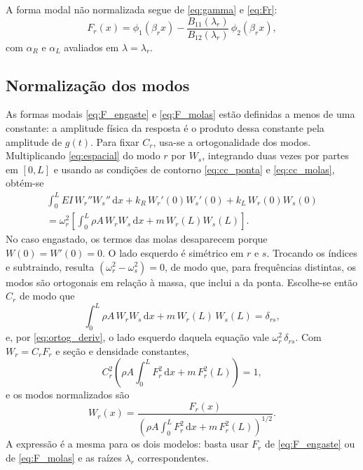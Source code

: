A forma modal não normalizada segue de \eqref{eq:gamma} e \eqref{eq:Fr}:
\begin{equation}
    F_r(x) = \phi_1(\beta_r x) - \frac{B_{11}(\lambda_r)}{B_{12}(\lambda_r)}\,
    \phi_2(\beta_r x),
    \label{eq:F_molas}
\end{equation}
com $\alpha_R$ e $\alpha_L$ avaliados em $\lambda = \lambda_r$.



\subsection{Normalização dos modos}
\label{sec:normalizacao}

As formas modais \eqref{eq:F_engaste} e \eqref{eq:F_molas} estão definidas a menos de
uma constante: a amplitude física da resposta é o produto dessa constante pela
amplitude de $g(t)$. Para fixar $C_r$, usa-se a ortogonalidade dos modos.
Multiplicando \eqref{eq:espacial} do modo $r$ por $W_s$, integrando duas vezes por
partes em $[0, L]$ e usando as condições de contorno \eqref{eq:cc_ponta} e
\eqref{eq:cc_molas}, obtém-se
\begin{multline}
    \int_0^L EI\,W_r''W_s''\,\mathrm{d}x + k_R\,W_r'(0)W_s'(0) + k_L\,W_r(0)W_s(0) \\
    = \omega_r^2\left[\int_0^L \rho A\,W_rW_s\,\mathrm{d}x + m\,W_r(L)W_s(L)\right].
    \label{eq:ortog_deriv}
\end{multline}
No caso engastado, os termos das molas desaparecem porque $W(0) = W'(0) = 0$. O lado
esquerdo é simétrico em $r$ e $s$. Trocando os índices e subtraindo, resulta
$(\omega_r^2 - \omega_s^2) = 0$, de modo que, para frequências distintas, os
modos são ortogonais em relação à massa, que inclui a da ponta. Escolhe-se então
$C_r$ de modo que
\begin{equation}
    \int_0^L \rho A\,W_r W_s\,\mathrm{d}x + m\,W_r(L)\,W_s(L) = \delta_{rs},
    \label{eq:ortonormal}
\end{equation}
e, por \eqref{eq:ortog_deriv}, o lado esquerdo daquela equação vale $\omega_r^2\,\delta_{rs}$.
Com $W_r = C_r F_r$ e seção e densidade constantes,
\begin{equation}
    C_r^2\left(\rho A\int_0^L F_r^2\,\mathrm{d}x + m\,F_r^2(L)\right) = 1,
\end{equation}
e os modos normalizados são
\begin{equation}
    W_r(x) = \frac{F_r(x)}{\left(\rho A\displaystyle\int_0^L F_r^2\,\mathrm{d}x
        + m\,F_r^2(L)\right)^{1/2}}.
    \label{eq:Wr_norm}
\end{equation}
A expressão é a mesma para os dois modelos: basta usar $F_r$ de
\eqref{eq:F_engaste} ou de \eqref{eq:F_molas} e as raízes $\lambda_r$ correspondentes.


